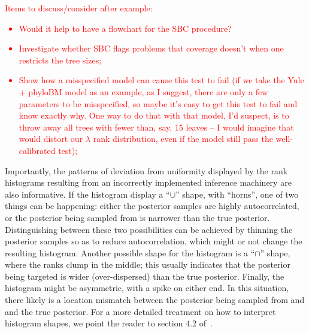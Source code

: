\documentclass[oneside]{article}
\begin{document}
\textcolor{red}{
  Items to discuss/consider after example:
  \begin{itemize}
  \item Would it help to have a flowchart for the SBC procedure?
  \item Investigate whether SBC flags problems that coverage doesn't when one restricts the tree sizes;
  \item Show how a misspecified model can cause this test to fail
    (if we take the Yule + phyloBM model as an example, as I suggest,
    there are only a few parameters to be misspecified, so maybe it's
    easy to get this test to fail and know exactly why. One way to do that
    with that model, I'd suspect, is to throw away all trees with
    fewer than, say, 15 leaves -- I would imagine that would distort
    our $\lambda$ rank distribution, even if the model still pass
    the well-calibrated test);
  \end{itemize}
}

Importantly, the patterns of deviation from uniformity displayed by the rank histograms resulting from an incorrectly implemented inference machinery are also informative.
If the histogram display a ``$\cup$'' shape, with ``horns'', one of two things can be happening: either the posterior samples are highly autocorrelated, or the posterior being sampled from is narrower than the true posterior.
Distinguishing between these two possibilities can be achieved by thinning the posterior samples so as to reduce autocorrelation, which might or not change the resulting histogram.
Another possible shape for the histogram is a ``$\cap$'' shape, where the ranks clump in the middle; this usually indicates that the posterior being targeted is wider (over-dispersed) than the true posterior.
Finally, the histogram might be asymmetric, with a spike on either end. 
In this situation, there likely is a location mismatch between the  posterior being sampled from and and the true posterior.
For a more detailed treatment on how to interpret histogram shapes, we point the reader to section 4.2 of~\cite{Talts2018}.
\end{document}
